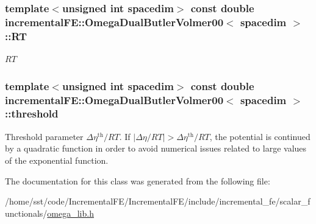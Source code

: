 \subsubsection[{\texorpdfstring{RT}{RT}}]{\setlength{\rightskip}{0pt plus 5cm}template$<$unsigned int spacedim$>$ const double {\bf incremental\+F\+E\+::\+Omega\+Dual\+Butler\+Volmer00}$<$ spacedim $>$\+::RT\hspace{0.3cm}{\ttfamily [private]}}\hypertarget{classincremental_f_e_1_1_omega_dual_butler_volmer00_a2f32c4f92c11646ed2f6741977d9833f}{}\label{classincremental_f_e_1_1_omega_dual_butler_volmer00_a2f32c4f92c11646ed2f6741977d9833f}
$RT$ 
\subsubsection[{\texorpdfstring{threshold}{threshold}}]{\setlength{\rightskip}{0pt plus 5cm}template$<$unsigned int spacedim$>$ const double {\bf incremental\+F\+E\+::\+Omega\+Dual\+Butler\+Volmer00}$<$ spacedim $>$\+::threshold\hspace{0.3cm}{\ttfamily [private]}}\hypertarget{classincremental_f_e_1_1_omega_dual_butler_volmer00_abdc57ace8b842d20ea8f8941b948db41}{}\label{classincremental_f_e_1_1_omega_dual_butler_volmer00_abdc57ace8b842d20ea8f8941b948db41}
Threshold parameter $\Delta \eta^\mathrm{th}/RT$. If $|\Delta \eta/RT| > \Delta \eta^\mathrm{th}/RT$, the potential is continued by a quadratic function in order to avoid numerical issues related to large values of the exponential function. 

The documentation for this class was generated from the following file\+:\begin{DoxyCompactItemize}
\item 
/home/sst/code/\+Incremental\+F\+E/\+Incremental\+F\+E/include/incremental\+\_\+fe/scalar\+\_\+functionals/\hyperlink{omega__lib_8h}{omega\+\_\+lib.\+h}\end{DoxyCompactItemize}
